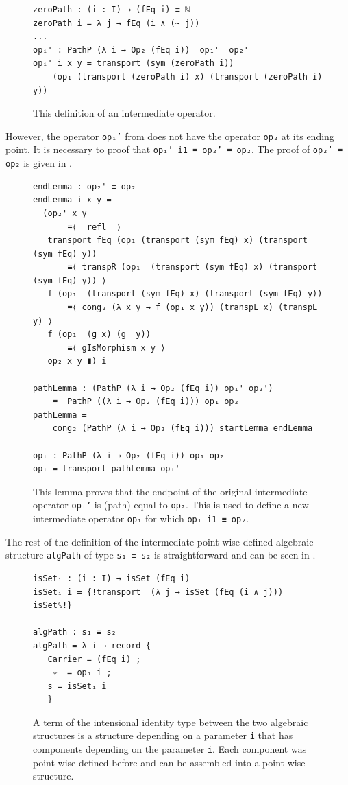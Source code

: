 \documentclass[12pt,a4paper,twoside,xetex]{book} %
\begin{document}
\begin{figure}\label{zeroPathLift}
\centering 
\begin{BVerbatim}
zeroPath : (i : I) → (fEq i) ≡ ℕ
zeroPath i = λ j → fEq (i ∧ (~ j))
...
opᵢ' : PathP (λ i → Op₂ (fEq i))  op₁'  op₂'
opᵢ' i x y = transport (sym (zeroPath i))
    (op₁ (transport (zeroPath i) x) (transport (zeroPath i) y))
\end{BVerbatim}
\caption{This definition of an intermediate operator.}

\end{figure}

However, the operator \texttt{opᵢ'} from  does not have the operator \texttt{op₂} at its ending point. It is necessary to proof
that  \texttt{opᵢ' i1 ≡ op₂' ≡ op₂}. The proof of \texttt{op₂' ≡ op₂} is given in .

\begin{figure}\label{adaptedOp}
 \centering
\begin{BVerbatim}
endLemma : op₂' ≡ op₂
endLemma i x y =
  (op₂' x y
       ≡⟨  refl  ⟩
   transport fEq (op₁ (transport (sym fEq) x) (transport (sym fEq) y))
       ≡⟨ transpR (op₁  (transport (sym fEq) x) (transport (sym fEq) y)) ⟩
   f (op₁  (transport (sym fEq) x) (transport (sym fEq) y))
       ≡⟨ cong₂ (λ x y → f (op₁ x y)) (transpL x) (transpL y) ⟩
   f (op₁  (g x) (g  y))
       ≡⟨ gIsMorphism x y ⟩
   op₂ x y ∎) i

pathLemma : (PathP (λ i → Op₂ (fEq i)) op₁' op₂') 
    ≡  PathP ((λ i → Op₂ (fEq i))) op₁ op₂
pathLemma = 
    cong₂ (PathP (λ i → Op₂ (fEq i))) startLemma endLemma

opᵢ : PathP (λ i → Op₂ (fEq i)) op₁ op₂
opᵢ = transport pathLemma opᵢ'
\end{BVerbatim}

\caption{This lemma proves that the endpoint of the original 
intermediate operator \texttt{opᵢ'} is (path) equal to
\texttt{op₂}. This is used to define a new intermediate operator 
\texttt{opᵢ} for which \texttt{opᵢ i1 ≡ op₂}.}   
\end{figure}

The rest of the definition of the intermediate point-wise defined algebraic 
structure \texttt{algPath} of type \texttt{s₁ ≡ s₂} is straightforward and can be seen in . 

\begin{figure}\label{algpath}
\centering
 \begin{BVerbatim}
isSetᵢ : (i : I) → isSet (fEq i)
isSetᵢ i = {!transport  (λ j → isSet (fEq (i ∧ j))) isSetℕ!} 

algPath : s₁ ≡ s₂
algPath = λ i → record {
   Carrier = (fEq i) ;
   _✧_ = opᵢ i ;
   s = isSetᵢ i
   }
 \end{BVerbatim}

 \caption{A term of the intensional identity type between the two algebraic 
structures is a structure depending on a parameter \texttt{i} that has 
components depending on the parameter \texttt{i}. Each component was point-wise 
defined before and can be assembled into a point-wise structure.}
\end{figure}
\end{document}
